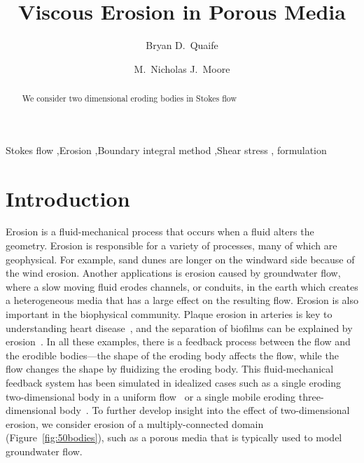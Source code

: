 \documentclass[preprint, 10pt]{elsarticle}
\begin{document}
\title{Viscous Erosion in Porous Media}

\author[Bryan]{Bryan D.~Quaife}
\author[Nick]{M.~Nicholas J.~Moore}
\address[Nick]{Department of Mathematics and Geophysical Fluid Dynamics Institute, Florida State University, Tallahassee, FL, 32306.}
\address[Bryan]{Department of Scientific Computing and Geophysical Fluid Dynamics Institute, Florida State University, Tallahassee, FL, 32306.}

\begin{abstract} 
We consider two dimensional eroding bodies in Stokes flow
\end{abstract}

\begin{keyword}
  Stokes flow \sep Erosion \sep Boundary integral method \sep Shear
  stress \sep {\thL} formulation
\end{keyword}

\maketitle

\section{Introduction\label{s:intro}}
Erosion is a fluid-mechanical process that occurs when a fluid alters
the geometry.  Erosion is responsible for a variety of processes, many
of which are geophysical.  For example, sand dunes are longer on the
windward side because of the wind erosion.  Another applications is
erosion caused by groundwater flow, where a slow moving fluid erodes
channels, or conduits, in the earth which creates a heterogeneous media
that has a large effect on the resulting flow. Erosion is also important
in the biophysical community. Plaque erosion in arteries is
key to understanding heart disease~\cite{sha2002,
gro-gij-van-fer-hat-van-yua-wen2007}, and the separation of biofilms can
be explained by erosion~\cite{pic-van-hei2000}. In all these examples,
there is a feedback process between the flow and the erodible
bodies---the shape of the eroding body affects the flow, while the flow
changes the shape by fluidizing the eroding body.  This fluid-mechanical
feedback system has been simulated in idealized cases such as a single
eroding two-dimensional body in a uniform
flow~\cite{moo-ris-chi-zha-she2013} or a single mobile eroding
three-dimensional body~\cite{mit-spa2016}. To further develop insight
into the effect of two-dimensional erosion, we consider erosion of a
multiply-connected domain (Figure~\ref{fig:50bodies}), such as a porous
media that is typically used to model groundwater flow.
\end{document}
